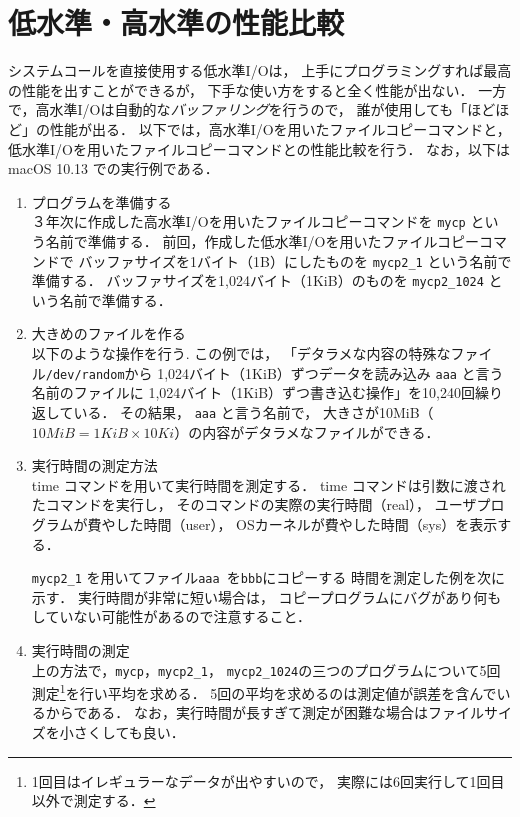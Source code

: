 \section{低水準・高水準の性能比較}
システムコールを直接使用する低水準I/Oは，
上手にプログラミングすれば最高の性能を出すことができるが，
下手な使い方をすると全く性能が出ない．
一方で，高水準I/Oは自動的な\emph{バッファリング}を行うので，
誰が使用しても「ほどほど」の性能が出る．
以下では，高水準I/Oを用いたファイルコピーコマンドと，
低水準I/Oを用いたファイルコピーコマンドとの性能比較を行う．
なお，以下は macOS 10.13 での実行例である．

\begin{enumerate}
\item プログラムを準備する  \\
３年次に作成した高水準I/Oを用いたファイルコピーコマンドを
\texttt{mycp} という名前で準備する．
前回，作成した低水準I/Oを用いたファイルコピーコマンドで
バッファサイズを1バイト（1B）にしたものを
\texttt{mycp2\_1} という名前で準備する．
バッファサイズを1,024バイト（1KiB）のものを
\texttt{mycp2\_1024} という名前で準備する．

\item 大きめのファイルを作る \\
以下のような操作を行う.
この例では，
「デタラメな内容の特殊なファイル\texttt{/dev/random}から
1,024バイト（1KiB）ずつデータを読み込み
\texttt{aaa} と言う名前のファイルに
1,024バイト（1KiB）ずつ書き込む操作」を10,240回繰り返している．
その結果， \texttt{aaa} と言う名前で，
大きさが10MiB（$10MiB = 1KiB \times 10Ki$）の内容がデタラメなファイルができる．



\item 実行時間の測定方法 \\
time コマンドを用いて実行時間を測定する．
time コマンドは引数に渡されたコマンドを実行し，
そのコマンドの実際の実行時間（real），
ユーザプログラムが費やした時間（user），
OSカーネルが費やした時間（sys）を表示する．

\texttt{mycp2\_1} を用いてファイル\texttt{aaa }を\texttt{bbb}にコピーする
時間を測定した例を次に示す．
実行時間が非常に短い場合は，
コピープログラムにバグがあり何もしていない可能性があるので注意すること．



\item 実行時間の測定 \\
上の方法で，\texttt{mycp}，\texttt{mycp2\_1}，
\texttt{mycp2\_1024}の三つのプログラムについて5回測定\footnote{
1回目はイレギュラーなデータが出やすいので，
実際には6回実行して1回目以外で測定する．
}を行い平均を求める．
5回の平均を求めるのは測定値が誤差を含んでいるからである．
なお，実行時間が長すぎて測定が困難な場合はファイルサイズを小さくしても良い．
\end{enumerate}


